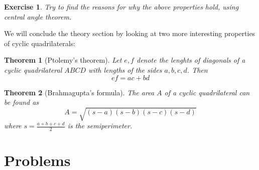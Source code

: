 \documentclass[11pt,a5paper]{article}
\newtheorem{exercise}{Exercise}
\newtheorem*{Theorem}{Theorem}
\begin{document}
\begin{exercise}
Try to find the reasons for why the above properties hold, using central angle theorem.
\end{exercise}

\noindent We will conclude the theory section by looking at two more interesting properties of cyclic quadrilaterals:

\begin{Theorem}[Ptolemy's theorem] 
Let $e,f$ denote the lenghts of diagonals of a cyclic quadrilateral $ABCD$ with lengths of the sides $a,b,c,d$. Then \[ef = ac + bd\]
\end{Theorem}

\begin{Theorem}[Brahmagupta's formula]
The area $A$ of a cyclic quadrilateral can be found as \[A = \sqrt{(s-a)(s-b)(s-c)(s-d)}\]
where $s = \frac{a+b+c+d}{2}$ is the semiperimeter.
\end{Theorem}

\section{Problems}
\end{document}
